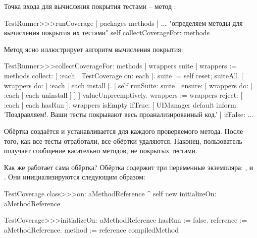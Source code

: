 \documentclass[a4paper,10pt,twoside]{book}
\begin{document}
Точка входа для вычисления покрытия тестами -- метод :
\begin{code}{}
TestRunner>>>runCoverage
	| packages methods |
	... "определяем методы для вычисления покрытия их тестами"
	self collectCoverageFor: methods
\end{code}

Метод  ясно иллюстрирует алгоритм вычисления покрытия:
\begin{code}{}
TestRunner>>>collectCoverageFor: methods
	| wrappers suite |
	wrappers := methods collect: [ :each | TestCoverage on: each ].
	suite := self
		reset;
		suiteAll.
	[ wrappers do: [ :each | each install ].
	  [ self runSuite: suite ] ensure: [ wrappers do: [ :each | each uninstall ] ] ] valueUnpreemptively.
	wrappers := wrappers reject: [ :each | each hasRun ].
	wrappers isEmpty 
		ifTrue: 
			[ UIManager default inform: 'Поздравляем!. Ваши тесты покрывают весь проанализированный код.' ]
		ifFalse: ...
\end{code}
Обёртка создаётся и устанавливается для каждого проверяемого метода.
После того, как все тесты отработали, все обёртки удаляются.
Наконец, пользователь получает сообщение касательно методов, не покрытых тестами.

Как же работает сама обёртка?
Обёртка  содержит три переменные экземпляра: ,  и .
Они инициализируются следующим образом:
\begin{code}{}
TestCoverage class>>>on: aMethodReference
	^ self new initializeOn: aMethodReference

TestCoverage>>>initializeOn: aMethodReference
	hasRun := false.
	reference := aMethodReference.
	method := reference compiledMethod
\end{code}
\end{document}
